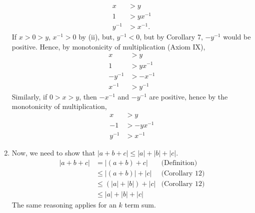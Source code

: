 \documentclass[12pt]{book}
\theoremstyle{definition}
\begin{document}
\begin{sol}
\begin{enumerate}[label=(\roman*)]
		\begin{align*}
			x&>y\\
			1&>yx^{-1}\\
			y^{-1}&>x^{-1}.	
		\end{align*}
		If $x>0>y$, $x^{-1}>0$ by (ii), but, $y^{-1}<0$, but by Corollary 7, $-y^{-1}$ would be positive. Hence, by monotonicity of multiplication (Axiom IX),
		\begin{align*}
			x&>y\\
			1&>yx^{-1}\\
			-y^{-1}&> -x^{-1}\\
			x^{-1}&>y^{-1} 
		\end{align*}
		Similarly, if $0>x>y$, then $-x^{-1}$ and $-y^{-1}$ are positive, hence by the monotonicity of multiplication,
		\begin{align*}
			x&>y\\
			-1&>-yx^{-1}\\
			y^{-1}&>x^{-1}
		\end{align*}
	\item Now, we need to show that $|a+b+c|\leq |a|+|b|+|c|$. 
		 \begin{align*}
		 		|a+b+c| &= |(a+b)+c| & \text{(Definition)}\\
		 		&\leq |(a+b)|+|c| &\text{(Corollary 12)}\\
		 		&\leq (|a|+|b|)+|c| & \text{(Corollary 12)}\\
		 		&\leq |a|+|b|+|c| 
		 \end{align*}
		 The same reasoning applies for an $k$ term sum.
\end{enumerate}

\end{sol}



\end{document}
